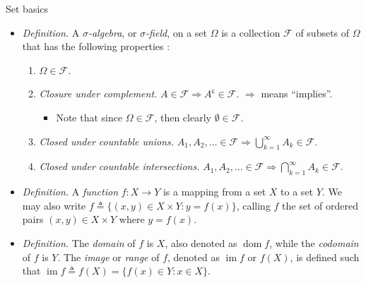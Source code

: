 \documentclass{beamer}
\numberwithin{equation}{section}
\begin{document}
\begin{frame}{Set basics}
    \begin{itemize}
        \item
        \textit{Definition.} A  $ \sigma $\textit{-algebra}, or
        $ \sigma $\textit{-field}, on a set $ \Omega $ is a collection
        $ \mathcal{F} $ of subsets of $ \Omega $ that has the following
        properties \cite{tamuz_prob}:
        \begin{enumerate}
            \item
            $ \Omega \in \mathcal{F} $.

            \item
            \textit{Closure under complement.} $ A \in \mathcal{F} \Rightarrow
            A^\mathsf{c} \in \mathcal{F} $. $ \Rightarrow $ means ``implies''.
            \begin{itemize}
                \item
                Note that since $ \Omega \in \mathcal{F} $, then clearly
                $ \emptyset \in \mathcal{F} $.
            \end{itemize}

            \item
            \textit{Closed under countable unions.} $ A_1, A_2, \ldots \in
            \mathcal{F} \Rightarrow \bigcup_{k = 1}^\infty
            A_k \in \mathcal{F} $.

            \item
            \textit{Closed under countable intersections.} $ A_1, A_2,
            \ldots \in \mathcal{F} \Rightarrow \bigcap_{k = 1}^\infty A_k
            \in \mathcal{F} $.
        \end{enumerate}

        \item
        \textit{Definition.} A \textit{function} $ f : X \rightarrow Y $ is a
        mapping from a set $ X $ to a set $ Y $. We may also write
        $ f \triangleq \{(x, y) \in X \times Y : y = f(x)\} $, calling $ f $
        the set of ordered pairs $ (x, y) \in X \times Y $ where $ y = f(x) $.

        \item
        \textit{Definition.} The \textit{domain} of $ f $ is $ X $, also
        denoted as $ \operatorname{dom} f $, while the \textit{codomain} of
        $ f $ is $ Y $. The \textit{image} or \textit{range} of $ f $, denoted
        as $ \operatorname{im} f $ or $ f(X) $, is defined such that
        $ \operatorname{im} f \triangleq f(X) = \{f(x) \in Y : x \in X\} $.
    \end{itemize}
\end{frame}
\end{document}
